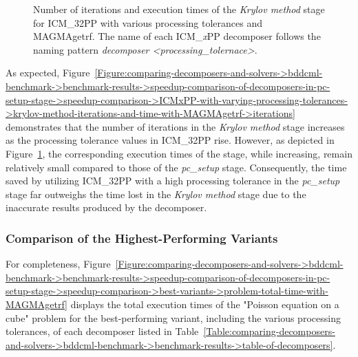 \begin{figure}[ht!]
\begin{subfigure}{\textwidth}
		\label{Figure:comparing-decomposers-and-solvers->bddcml-benchmark->benchmark-results->speedup-comparison-of-decomposers-in-pc-setup-stage->speedup-comparison->ICMxPP-with-varying-processing-tolerances->krylov-method-iterations-and-time-with-MAGMAgetrf->time}
	\end{subfigure}
	\caption{Number of iterations and execution times of the \textit{Krylov method} stage for ICM\_32PP with various processing tolerances and MAGMAgetrf. The name of each ICM\_\textit{x}PP decomposer follows the naming pattern \textit{decomposer <processing\_tolernace>}.}
	\label{Figure:comparing-decomposers-and-solvers->bddcml-benchmark->benchmark-results->speedup-comparison-of-decomposers-in-pc-setup-stage->speedup-comparison->ICMxPP-with-varying-processing-tolerances->krylov-method-iterations-and-time-with-MAGMAgetrf}
\end{figure}

As expected, Figure~\ref{Figure:comparing-decomposers-and-solvers->bddcml-benchmark->benchmark-results->speedup-comparison-of-decomposers-in-pc-setup-stage->speedup-comparison->ICMxPP-with-varying-processing-tolerances->krylov-method-iterations-and-time-with-MAGMAgetrf->iterations} demonstrates that the number of iterations in the \textit{Krylov method} stage increases as the processing tolerance values in ICM\_32PP rise. However, as depicted in Figure~\ref{Figure:comparing-decomposers-and-solvers->bddcml-benchmark->benchmark-results->speedup-comparison-of-decomposers-in-pc-setup-stage->speedup-comparison->ICMxPP-with-varying-processing-tolerances->krylov-method-iterations-and-time-with-MAGMAgetrf->time}, the corresponding execution times of the stage, while increasing, remain relatively small compared to those of the \textit{pc\_setup} stage. Consequently, the time saved by utilizing ICM\_32PP with a high processing tolerance in the \textit{pc\_setup} stage far outweighs the time lost in the \textit{Krylov method} stage due to the inaccurate results produced by the decomposer.

\subsubsection{Comparison of the Highest-Performing Variants} For completeness, Figure~\ref{Figure:comparing-decomposers-and-solvers->bddcml-benchmark->benchmark-results->speedup-comparison-of-decomposers-in-pc-setup-stage->speedup-comparison->best-variants->problem-total-time-with-MAGMAgetrf} displays the total execution times of the "Poisson equation on a cube" problem for the best-performing variant, including the various processing tolerances, of each decomposer listed in Table~\ref{Table:comparing-decomposers-and-solvers->bddcml-benchmark->benchmark-results->table-of-decomposers}.

